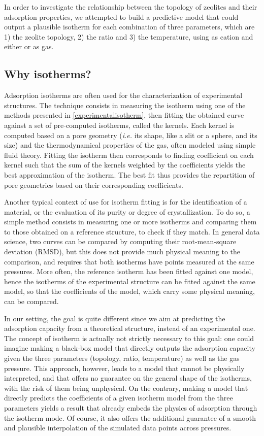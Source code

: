\documentclass[main.tex]{subfiles}
\begin{document}
In order to investigate the relationship between the topology of zeolites and their adsorption properties, we attempted to build a predictive model that could output a plausible isotherm for each combination of three parameters, which are 1) the zeolite topology, 2) the \SiAl ratio and 3) the temperature, using  as cation and either  or  as gas.

\subsection{Why isotherms?}

Adsorption isotherms are often used for the characterization of experimental structures. The technique consists in measuring the isotherm using one of the methods presented in \cref{experimentalisotherm}, then fitting the obtained curve against a set of pre-computed isotherms, called the kernels. Each kernel is computed based on a pore geometry (\textit{i.e.} its shape, like a slit or a sphere, and its size) and the thermodynamical properties of the gas, often modeled using simple fluid theory. Fitting the isotherm then corresponds to finding coefficient on each kernel such that the sum of the kernels weighted by the coefficients yields the best approximation of the isotherm. The best fit thus provides the repartition of pore geometries based on their corresponding coefficients.

Another typical context of use for isotherm fitting is for the identification of a material, or the evaluation of its purity or degree of crystallization. To do so, a simple method consists in measuring one or more isotherms and comparing them to those obtained on a reference structure, to check if they match. In general data science, two curves can be compared by computing their root-mean-square deviation (RMSD), but this does not provide much physical meaning to the comparison, and requires that both isotherms have points measured at the same pressures. More often, the reference isotherm has been fitted against one model, hence the isotherms of the experimental structure can be fitted against the same model, so that the coefficients of the model, which carry some physical meaning, can be compared.

In our setting, the goal is quite different since we aim at predicting the adsorption capacity from a theoretical structure, instead of an experimental one. The concept of isotherm is actually not strictly necessary to this goal: one could imagine making a black-box model that directly outputs the adsorption capacity given the three parameters (topology, \SiAl ratio, temperature) as well as the gas pressure. This approach, however, leads to a model that cannot be physically interpreted, and that offers no guarantee on the general shape of the isotherms, with the risk of them being unphysical. On the contrary, making a model that directly predicts the coefficients of a given isotherm model from the three parameters yields a result that already embeds the physics of adsorption through the isotherm mode. Of course, it also offers the additional guarantee of a smooth and plausible interpolation of the simulated data points across pressures.
\end{document}

